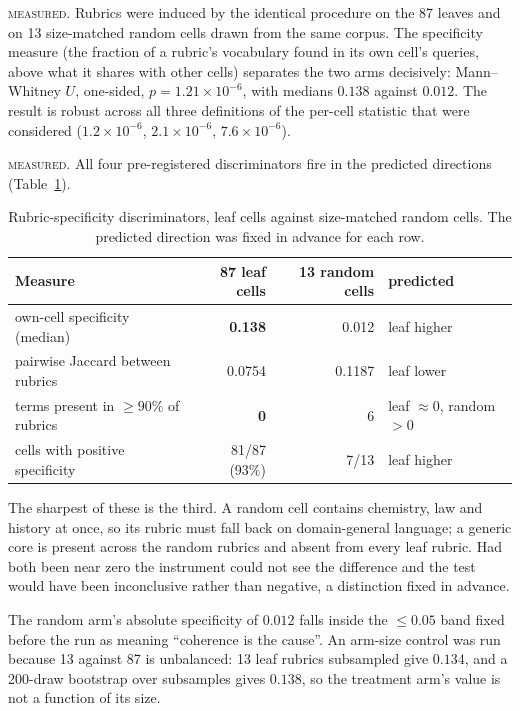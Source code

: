 \textsc{measured.} Rubrics were induced by the identical procedure on
the 87 leaves and on 13 size-matched random cells drawn from the same
corpus. The specificity measure (the fraction of a rubric's
vocabulary found in its own cell's queries, above what it shares with
other cells) separates the two arms decisively: Mann--Whitney $U$,
one-sided, $p = 1.21 \times 10^{-6}$, with medians $0.138$ against
$0.012$. The result is robust across all three definitions of the
per-cell statistic that were considered
($1.2\times10^{-6}$, $2.1\times10^{-6}$, $7.6\times10^{-6}$).

\textsc{measured.} All four pre-registered discriminators fire in the
predicted directions (Table~\ref{tab:rubric-null}).

\begin{table}[htbp]
\centering
\caption{Rubric-specificity discriminators, leaf cells against
size-matched random cells. The predicted direction was fixed in advance
for each row.}
\label{tab:rubric-null}
\begin{tabular}{lrrl}
\toprule
Measure & 87 leaf cells & 13 random cells & predicted \\
\midrule
own-cell specificity (median) & \textbf{0.138} & 0.012 & leaf higher \\
pairwise Jaccard between rubrics & 0.0754 & 0.1187 & leaf lower \\
terms present in $\geq 90\%$ of rubrics & \textbf{0} & 6 & leaf $\approx 0$, random $>0$ \\
cells with positive specificity & 81/87 (93\%) & 7/13 & leaf higher \\
\bottomrule
\end{tabular}
\end{table}

The sharpest of these is the third. A random cell contains chemistry,
law and history at once, so its rubric must fall back on domain-general
language; a generic core is present across the random rubrics and
absent from every leaf rubric. Had both been near zero the instrument
could not see the difference and the test would have been inconclusive
rather than negative, a distinction fixed in advance.

The random arm's absolute specificity of $0.012$ falls inside the
$\leq 0.05$ band fixed before the run as meaning ``coherence is the
cause''. An arm-size control was run because 13 against 87 is
unbalanced: 13 leaf rubrics subsampled give $0.134$, and a 200-draw
bootstrap over subsamples gives $0.138$, so the treatment arm's value
is not a function of its size.


